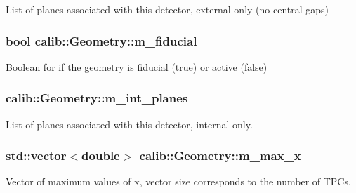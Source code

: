List of planes associated with this detector, external only (no central gaps) 

\hypertarget{classcalib_1_1Geometry_a5b77d43d5d1eab632f65c7615663015f}{
\subsubsection[{m\-\_\-fiducial}]{\setlength{\rightskip}{0pt plus 5cm}bool calib\-::\-Geometry\-::m\-\_\-fiducial\hspace{0.3cm}{\ttfamily [private]}}}\label{classcalib_1_1Geometry_a5b77d43d5d1eab632f65c7615663015f}


Boolean for if the geometry is fiducial (true) or active (false) 

\hypertarget{classcalib_1_1Geometry_a7c58e24298b07a7d2feacf2ab5d33b04}{
\subsubsection[{m\-\_\-int\-\_\-planes}]{ calib\-::\-Geometry\-::m\-\_\-int\-\_\-planes\hspace{0.3cm}{\ttfamily [private]}}}\label{classcalib_1_1Geometry_a7c58e24298b07a7d2feacf2ab5d33b04}


List of planes associated with this detector, internal only. 

\hypertarget{classcalib_1_1Geometry_a76078aab02f168c6d57aab439bc959c0}{
\subsubsection[{m\-\_\-max\-\_\-x}]{\setlength{\rightskip}{0pt plus 5cm}std\-::vector$<$double$>$ calib\-::\-Geometry\-::m\-\_\-max\-\_\-x\hspace{0.3cm}{\ttfamily [private]}}}\label{classcalib_1_1Geometry_a76078aab02f168c6d57aab439bc959c0}


Vector of maximum values of x, vector size corresponds to the number of T\-P\-Cs. 

